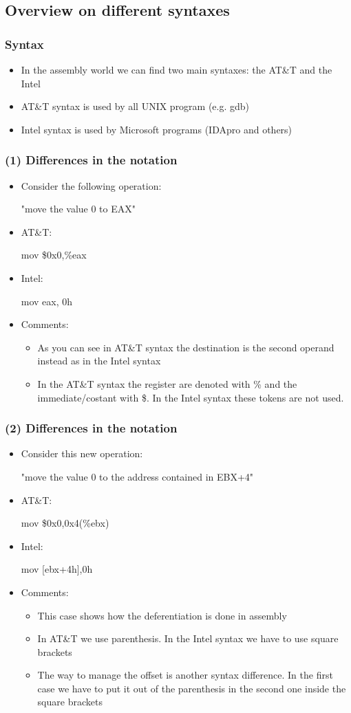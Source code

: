 \documentclass[]{beamer}
\begin{document}
	\subsection{Overview on different syntaxes}
		\begin{frame}
			\frametitle{Syntax}
			\begin{itemize}
				\item{In the assembly world we can find two main syntaxes: the AT\&T and the Intel}
				\item{AT\&T syntax is used by all UNIX program (e.g. gdb)}
				\item{Intel syntax is used by Microsoft programs (IDApro and others)}
			\end{itemize}
		\end{frame}
		\begin{frame}
			\frametitle{(1) Differences in the notation}
			\begin{itemize}
				\item{Consider the following operation:\newline\centerline{"move the value 0 to EAX"}}
				\item{AT\&T: \centerline{ mov \$0x0,\%eax} }
				\item{Intel: \centerline{ mov eax, 0h}}
				\item{Comments:} 
				\begin{itemize}
					\item{As you can see in AT\&T syntax the destination is the second operand instead as in the Intel syntax}
					\item{In the AT\&T syntax the register are denoted with \% and the immediate/costant with \$. In the Intel syntax these tokens are not used. }
				\end{itemize}
			\end{itemize}
		\end{frame}
		\begin{frame}
			\frametitle{(2) Differences in the notation}
			\begin{itemize}
				\item{Consider this new operation:\newline\centerline {"move the value 0 to the address contained in EBX+4"}}
				\item{AT\&T: \centerline{ mov \$0x0,0x4(\%ebx)}}
				\item{Intel: \centerline{ mov [ebx+4h],0h }}
				\item{Comments:}
				\begin{itemize}
					\item{This case shows how  the deferentiation is done in assembly}
					\item{In AT\&T we use parenthesis. In the Intel syntax we have to use square brackets}
					\item{The way to manage the offset is another syntax difference. In the first case we have to put it out of the parenthesis in the second one inside the square brackets }
				\end{itemize}
			\end{itemize}
		\end{frame}
\end{document}
